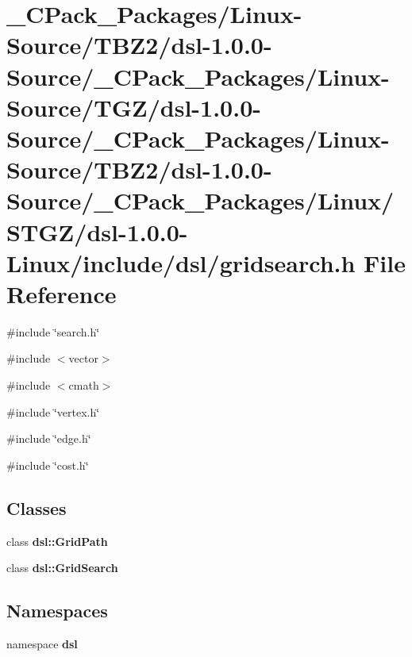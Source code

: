 \section{\_\-CPack\_\-Packages/Linux-\/Source/TBZ2/dsl-\/1.0.0-\/Source/\_\-CPack\_\-Packages/Linux-\/Source/TGZ/dsl-\/1.0.0-\/Source/\_\-CPack\_\-Packages/Linux-\/Source/TBZ2/dsl-\/1.0.0-\/Source/\_\-CPack\_\-Packages/Linux/STGZ/dsl-\/1.0.0-\/Linux/include/dsl/gridsearch.h File Reference}
\label{__CPack__Packages_2Linux-Source_2TBZ2_2dsl-1_80_80-Source_2__CPack__Packages_2Linux-Source_2TGZ_a5b94ac1b6e31ebdd7fc2d07aea2b516}
{\ttfamily \#include \char`\"{}search.h\char`\"{}}\par
{\ttfamily \#include $<$vector$>$}\par
{\ttfamily \#include $<$cmath$>$}\par
{\ttfamily \#include \char`\"{}vertex.h\char`\"{}}\par
{\ttfamily \#include \char`\"{}edge.h\char`\"{}}\par
{\ttfamily \#include \char`\"{}cost.h\char`\"{}}\par
\subsection*{Classes}
\begin{DoxyCompactItemize}
\item 
class {\bf dsl::GridPath}
\item 
class {\bf dsl::GridSearch}
\end{DoxyCompactItemize}
\subsection*{Namespaces}
\begin{DoxyCompactItemize}
\item 
namespace {\bf dsl}
\end{DoxyCompactItemize}
